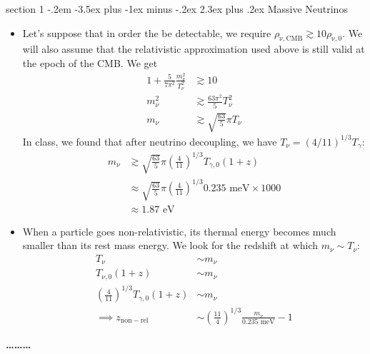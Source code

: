 \documentclass[12pt]{article}
\makeatletter
\newenvironment{problem}{\@startsection
	{section}
	{1}
	{-.2em}
	{-3.5ex plus -1ex minus -.2ex}
	{2.3ex plus .2ex}
	{\pagebreak[3]%
		\large\bf\noindent{Problem }
	}
}
{%
	\begin{center}\large\bf \ldots\ldots\ldots\end{center}}
\newcommand{\rhox}[1]{\ensuremath{\rho_\mathrm{#1} } }
\makeatother
\begin{document}
\begin{problem}{Massive Neutrinos}
\begin{itemize}
		\item Let's suppose that in order the be detectable, we require $\rhox{\nu,CMB} \gtrsim 10 \rhox{\nu,0}$.  We will also assume that the relativistic approximation used above is still valid at the epoch of the CMB. We get \begin{align*}
			1 + \frac{5}{7\pi^2 }\frac{m_\nu^2}{T_\nu^2} &\gtrsim 10
			\\
			m_\nu^2 &\gtrsim \frac{63\pi^2}{5}T_\nu^2
			\\
			m_\nu &\gtrsim \sqrt{\frac{63}{5}}\pi T_\nu
			\end{align*} In class, we found that after neutrino decoupling, we have $T_\nu = (4/11)^{1/3}T_\gamma$: \begin{align*}
			m_\nu &\gtrsim \sqrt{\frac{63}{5}}\pi \left(\frac{4}{11}\right)^{1/3} T_{\gamma,0} (1+z)
			\\
			&\approx \sqrt{\frac{63}{5}}\pi \left(\frac{4}{11}\right)^{1/3} 0.235 \text{ meV} \times 1000 
			\\
			&\approx \boxed{1.87 \text{ eV}}
		\end{align*}
		
		\item When a particle goes non-relativistic, its thermal energy becomes much smaller than its rest mass energy.  We look for the redshift at which $m_\nu \sim T_\nu$: \begin{align*}
			T_\nu &\sim m_\nu
			\\
			T_{\nu,0}(1 + z) &\sim m_\nu
			\\
			 \left(\frac{4}{11}\right)^{1/3} T_{\gamma,0} (1+z) &\sim m_\nu
			 \\
			 \implies z_\mathrm{non-rel} &\sim \left(\frac{11}{4}\right)^{1/3} \frac{m_\nu}{0.235 \text{ meV}} - 1
		\end{align*}
	\end{itemize}
		
	\end{problem}
	
\end{document}
